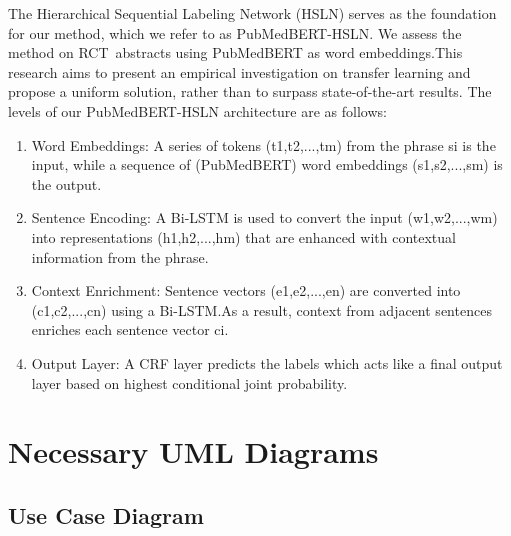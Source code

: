 \documentclass[12pt,a4paper]{report}     %
\begin{document}
\begin{normalsize}
{{ The Hierarchical Sequential Labeling Network (HSLN) serves as the foundation for our method, which we refer to as PubMedBERT-HSLN. We assess the method on RCT abstracts using PubMedBERT as word embeddings.This research aims to present an empirical investigation on transfer learning and propose a uniform solution, rather than to surpass state-of-the-art results. The levels of our PubMedBERT-HSLN architecture are as follows: \\
 \begin{enumerate}[label=\Roman*., itemsep=10pt]
    \item Word Embeddings:
          A series of tokens (t1,t2,...,tm) from the phrase si is the input, while a sequence of (PubMedBERT) word embeddings (s1,s2,...,sm) is the output.
    \item Sentence Encoding:
          A Bi-LSTM is used to convert the input (w1,w2,...,wm) into representations (h1,h2,...,hm) that are enhanced with contextual information from the phrase.
    \item Context Enrichment:
          Sentence vectors (e1,e2,...,en) are converted into (c1,c2,...,cn) using a Bi-LSTM.As a result, context from adjacent sentences enriches each sentence vector ci.
    \item Output Layer:
          A CRF layer predicts the labels which acts like a final output layer based on highest conditional joint probability.
    
\end{enumerate}
      


}
\section{Necessary UML Diagrams}
{\setlength{\baselineskip}{1.1\baselineskip}
\subsection{Use Case Diagram}

}}
\end{normalsize}
\end{document}
